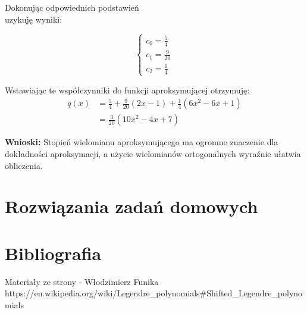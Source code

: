 \documentclass{article}
\begin{document}
\vspace{5mm}
\noindent
Dokonując odpowiednich podstawień\\
uzykuję wyniki:

\[\left\{
\begin{array}{l}
    c_0 = \frac{5}{4}\\
    c_1 = \frac{9}{20}\\
    c_2 = \frac{1}{4}
\end{array}
\right.\]

\noindent
Wstawiając te współczynniki do funkcji aproksymującej otrzymuję:
\begin{align*}
    q(x) &= \frac{5}{4} + \frac{9}{20}(2x - 1) + \frac{1}{4}(6x^2 - 6x + 1)\\
    &= \frac{3}{20} (10x^2 - 4x + 7)
\end{align*}

\vspace{15mm}
\noindent
\textbf{Wnioski:} Stopień wielomianu aproksymującego ma ogromne znaczenie dla dokładności aproksymacji, a użycie wielomianów ortogonalnych wyraźnie ułatwia obliczenia.

\clearpage

\section{Rozwiązania zadań domowych}

\subsection{}

\subsection{}

\subsection{}

\section{Bibliografia}
Materiały ze strony - Włodzimierz Funika\\
https://en.wikipedia.org/wiki/Legendre\_polynomials\#Shifted\_Legendre\_polynomials
\end{document}
